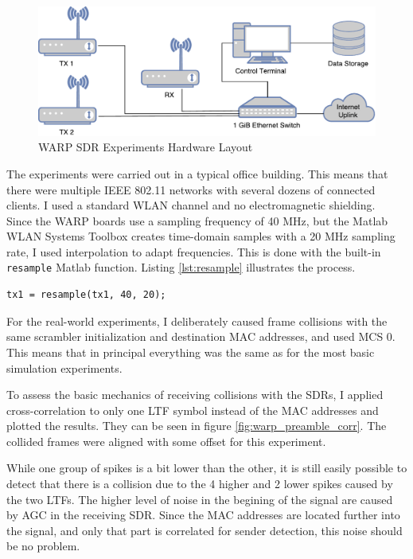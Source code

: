 \begin{figure}[H]
	\centering
	\includegraphics[width=\textwidth]{gfx/images/warp-layout}
	\caption{WARP SDR Experiments Hardware Layout}
	\label{fig:warp-layout}
\end{figure}

The experiments were carried out in a typical office building. This means that there were multiple IEEE 802.11 networks with several dozens of connected clients. I used a standard WLAN channel and no electromagnetic shielding.\\

Since the \gls{WARP} boards use a sampling frequency of 40 MHz, but the Matlab WLAN Systems Toolbox creates time-domain samples with a 20 MHz sampling rate, I used interpolation to adapt frequencies. This is done with the built-in \texttt{resample} Matlab function. Listing \ref{lst:resample} illustrates the process.

\begin{lstlisting}[captionpos=b,caption={Interpolate Sampling Rate},label=lst:resample]
% Interpolate to get from 20 to 40 MHz sampling rate
tx1 = resample(tx1, 40, 20);
\end{lstlisting}

For the real-world experiments, I deliberately caused frame collisions with the same scrambler initialization and destination \gls{MAC} addresses, and used \gls{MCS} 0. This means that in principal everything was the same as for the most basic simulation experiments.

To assess the basic mechanics of receiving collisions with the \glspl{SDR}, I applied cross-correlation to only one \gls{LTF} symbol instead of the \gls{MAC} addresses and plotted the results. They can be seen in figure \ref{fig:warp_preamble_corr}. The collided frames were aligned with some offset for this experiment.

While one group of spikes is a bit lower than the other, it is still easily possible to detect that there is a collision due to the 4 higher and 2 lower spikes caused by the two \glspl{LTF}. The higher level of noise in the begining of the signal are caused by \gls{AGC} in the receiving \gls{SDR}. Since the \gls{MAC} addresses are located further into the signal, and only that part is correlated for sender detection, this noise should be no problem.

